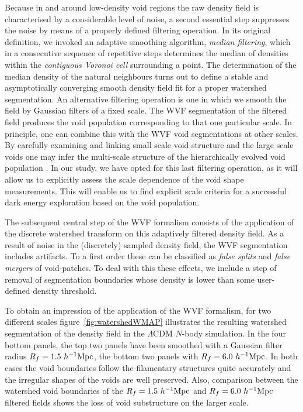 Because in and around low-density void regions the raw density field is characterised by a 
considerable level of noise, a second essential step suppresses the noise by means of
a properly defined filtering operation. In its original definition, we invoked an adaptive 
smoothing algorithm, {\it median filtering}, which in a consecutive sequence of repetitive steps 
determines the median of densities within the {\it contiguous Voronoi cell} surrounding a point. 
The determination of the median density of the natural neighbours turns out to define a stable and 
asymptotically converging smooth density field fit for a proper watershed segmentation. An 
alternative filtering operation is one in which we smooth the field by Gaussian filters of 
a fixed scale. The WVF segmentation of the filtered field produces the void population 
corresponding to that one particular scale. In principle, one can combine this with the 
WVF void segmentations at other scales. By carefully examining and linking small scale 
void structure and the large scale voids one may infer the multi-scale structure 
of the hierarchically evolved void population \citep{sheth04,aragon12}. In our study, 
we have opted for this last filtering operation, as it will allow us to explicitly assess 
the scale dependence of the void shape measurements. This will enable us to find explicit scale 
criteria for a successful dark energy exploration based on the void population. 
 
The subsequent central step of the WVF formalism consists of the application of the discrete 
watershed transform on this adaptively filtered density field. As a result of noise in the 
(discretely) sampled density field, the WVF segmentation includes artifacts. To a first order 
these can be classified as {\it false splits} and {\it false mergers} of void-patches. To deal 
with this these effects, we include a step of removal of segmentation boundaries whose density 
is lower than some user-defined density threshold.

To obtain an impression of the application of the WVF formalism, for two different 
scales figure~\ref{fig:watershedWMAP} illustrates the resulting watershed segmentation 
of the density field in the $\Lambda$CDM $N$-body simulation. In the four bottom
panels, the top two panels have been 
smoothed with a Gaussian filter radius $R_f = 1.5 ~h^{-1} {\rm Mpc}$, the bottom two panels with 
$R_f = 6.0 ~h^{-1} {\rm Mpc}$. In both cases the void boundaries follow the filamentary structures 
quite accurately and the irregular shapes of the voids are well preserved. Also, comparison 
between the watershed void boundaries of the $R_f=1.5~h^{-1} {\rm Mpc}$ and $R_f=6.0~h^{-1} {\rm Mpc}$ filtered 
fields shows the loss of void substructure on the larger scale. 

